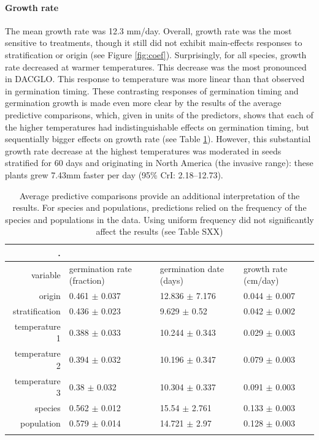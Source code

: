 \documentclass[12pt]{article}\usepackage[]{graphicx}\usepackage[]{color}
\begin{document}
	\paragraph{Growth rate} The mean growth rate was 12.3 mm/day. Overall, growth rate was the most sensitive to treatments, though it still did not exhibit main-effects responses to stratification or origin (see Figure \ref{fig:coef}). Surprisingly, for all species, growth rate decreased at warmer temperatures. This decrease was the most pronounced in DACGLO. This response to temperature was more linear than that observed in germination timing. These contrasting responses of germination timing and germination growth is made even more clear by the results of the average predictive comparisons, which, given in units of the predictors, shows that each of the higher temperatures had indistinguishable effects on germination timing, but sequentially bigger effects on growth rate (see Table \ref{tab:apc}).  However, this substantial growth rate decrease at the highest temperatures was moderated in seeds stratified for 60 days and originating in North America (the invasive range): these plants grew 7.43mm faster per day (95\% CrI: 2.18--12.73).

\begin{longtable}{rlll}
\caption{Average predictive comparisons provide an additional interpretation of the results. For species and populations, predictions relied on the frequency of the species and populations in the data. Using uniform frequency did not significantly affect the results (see Table SXX)}.
\label{tab:apc}\\
	\hline
	variable & germination rate (fraction) & germination date (days) & growth rate (cm/day) \\ 
	\hline
	origin & 0.461 $\pm$ 0.037 & 12.836 $\pm$ 7.176 & 0.044 $\pm$ 0.007 \\ 
	stratification & 0.436 $\pm$ 0.023 & 9.629 $\pm$ 0.52 & 0.042 $\pm$ 0.002 \\ 
	temperature 1 & 0.388 $\pm$ 0.033 & 10.244 $\pm$ 0.343 & 0.029 $\pm$ 0.003 \\ 
	temperature 2 & 0.394 $\pm$ 0.032 & 10.196 $\pm$ 0.347 & 0.079 $\pm$ 0.003 \\ 
	temperature 3 & 0.38 $\pm$ 0.032 & 10.304 $\pm$ 0.337 & 0.091 $\pm$ 0.003 \\ 
	species & 0.562 $\pm$ 0.012 & 15.54 $\pm$ 2.761 & 0.133 $\pm$ 0.003 \\ 
	population & 0.579 $\pm$ 0.014 & 14.721 $\pm$ 2.97 & 0.128 $\pm$ 0.003 \\ 
	\hline\\
	\hline
\end{longtable}
\end{document}
